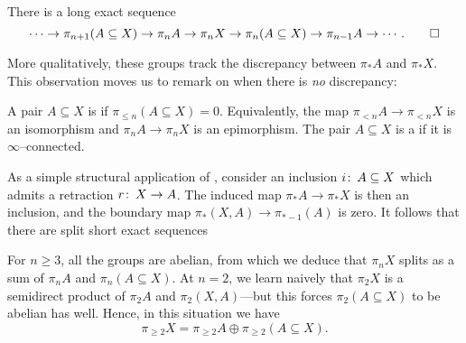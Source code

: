 \begin{corollary}\label{LexseqOfRelativeHtpy}%
There is a long exact sequence \[\cdots \to \pi_{n+1}(A \subseteq X) \to \pi_n A \to \pi_n X \to \pi_n (A \subseteq X) \to \pi_{n-1} A \to \cdots. \qed\]
\end{corollary}


\noindent
More qualitatively, these groups track the discrepancy between $\pi_* A$ and $\pi_* X$.
This observation moves us to remark on when there is \emph{no} discrepancy:

\begin{definition}\label{ConnectedDefn}%
A pair $A \subseteq X$ is  if $\pi_{\le n}(A \subseteq X) = 0$.
Equivalently, the map $\pi_{<n} A \to \pi_{<n} X$ is an isomorphism and $\pi_n A \to \pi_n X$ is an epimorphism.
The pair $A \subseteq X$ is a  if it is $\infty$--connected.
\end{definition}

\begin{remark}
As a simple structural application of , consider an inclusion $i\colon\thinspace A \subseteq X$ which admits a retraction $r\colon\thinspace X \to A$.
The induced map $\pi_* A \to \pi_* X$ is then an inclusion, and the boundary map $\pi_*(X, A) \to \pi_{*-1}(A)$ is zero.
It follows that there are split short exact sequences
\begin{center}
\end{center}
For $n \ge 3$, all the groups are abelian, from which we deduce that $\pi_n X$ splits as a sum of $\pi_n A$ and $\pi_n(A \subseteq X)$.
At $n = 2$, we learn naively that $\pi_2 X$ is a semidirect product of $\pi_2 A$ and $\pi_2(X, A)$---but this forces $\pi_2(A \subseteq X)$ to be abelian has well.
Hence, in this situation we have
\[\pi_{\ge 2} X = \pi_{\ge 2} A \oplus \pi_{\ge 2}(A \subseteq X).\]
\end{remark}

